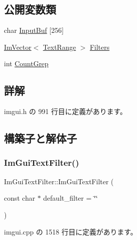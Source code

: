 \subsection*{公開変数類}
\begin{DoxyCompactItemize}
\item 
char \mbox{\hyperlink{struct_im_gui_text_filter_ad070acb1038199dd4e8f5d010c5cb5ba}{Input\+Buf}} \mbox{[}256\mbox{]}
\item 
\mbox{\hyperlink{class_im_vector}{Im\+Vector}}$<$ \mbox{\hyperlink{struct_im_gui_text_filter_1_1_text_range}{Text\+Range}} $>$ \mbox{\hyperlink{struct_im_gui_text_filter_a5a930a339a9384e6bfadfa56a7c111fd}{Filters}}
\item 
int \mbox{\hyperlink{struct_im_gui_text_filter_ac31839c319fe4211c21fc143b7249f86}{Count\+Grep}}
\end{DoxyCompactItemize}


\subsection{詳解}


 imgui.\+h の 991 行目に定義があります。



\subsection{構築子と解体子}
\mbox{\label{struct_im_gui_text_filter_a0a61ee76f0b4f3c354791734b06e3140}} 
\subsubsection{\texorpdfstring{Im\+Gui\+Text\+Filter()}{ImGuiTextFilter()}}
{\footnotesize\ttfamily Im\+Gui\+Text\+Filter\+::\+Im\+Gui\+Text\+Filter (\begin{DoxyParamCaption}\item[{const char $\ast$}]{default\+\_\+filter = {\ttfamily \char`\"{}\char`\"{}} }\end{DoxyParamCaption})}



 imgui.\+cpp の 1518 行目に定義があります。

\mbox{\label{struct_im_gui_text_filter_acaf7fdcdc879c7938d195714609aac87}} 
